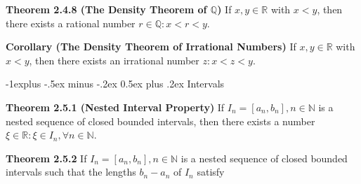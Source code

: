 \documentclass[10pt,landscape]{article}
\makeatletter
\renewcommand{\subsection}{\@startsection{subsection}{2}{0mm}%
                                {-1explus -.5ex minus -.2ex}%
                                {0.5ex plus .2ex}%
                                {\normalfont\normalsize\bfseries}}
\makeatother
\begin{document}
\begin{multicols}{4}
\textbf{Theorem 2.4.8 (The Density Theorem of $\mathbb{Q}$)} If $x, y \in \mathbb{R}$ with $x < y$, then there exists a rational number $r \in \mathbb{Q} : x < r < y$.

\textbf{Corollary (The Density Theorem of Irrational Numbers)} If $x, y \in \mathbb{R}$ with $x < y$, then there exists an irrational number $z : x < z < y$.







\subsection{Intervals}




\textbf{Theorem 2.5.1 (Nested Interval Property)} If $I_n = [a_n, b_n], n \in \mathbb{N}$ is a nested sequence of closed bounded intervals, then there exists a number $\xi \in \mathbb{R} : \xi \in I_n, \forall n \in \mathbb{N}$.

\textbf{Theorem 2.5.2} If $I_n = [a_n, b_n], n \in \mathbb{N}$ is a nested sequence of closed bounded intervals such that the lengths $b_n - a_n$ of $I_n$ satisfy


\end{multicols}
\end{document}
